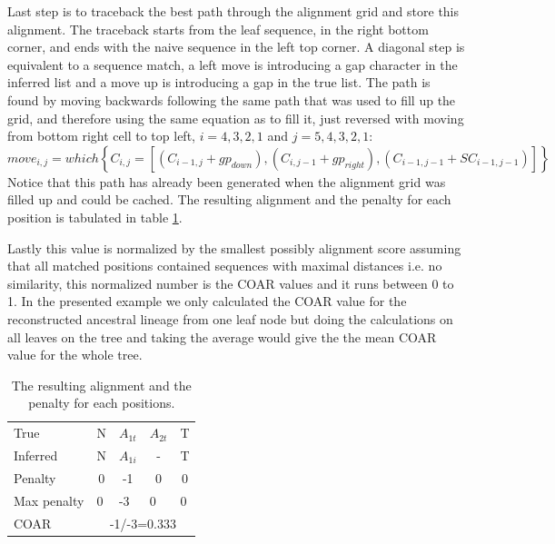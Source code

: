 Last step is to traceback the best path through the alignment grid and store this alignment.
The traceback starts from the leaf sequence, in the right bottom corner, and ends with the naive sequence in the left top corner.
A diagonal step is equivalent to a sequence match, a left move is introducing a gap character in the inferred list and a move up is introducing a gap in the true list.
The path is found by moving backwards following the same path that was used to fill up the grid, and therefore using the same equation as to fill it, just reversed with moving from bottom right cell to top left, $i=4,3,2,1$ and $j=5,4,3,2,1$:
$$
move_{i,j} = which\left\{ C_{i,j} = [(C_{i-1,j} + gp_{down}), (C_{i,j-1} + gp_{right}), (C_{i-1,j-1 } + SC_{i-1,j-1})] \right\}
$$
Notice that this path has already been generated when the alignment grid was filled up and could be cached. The resulting alignment and the penalty for each position is tabulated in table \ref{NW_final_alignment}.

Lastly this value is normalized by the smallest possibly alignment score assuming that all matched positions contained sequences with maximal distances i.e. no similarity, this normalized number is the COAR values and it runs between 0 to 1.
In the presented example we only calculated the COAR value for the reconstructed ancestral lineage from one leaf node but doing the calculations on all leaves on the tree and taking the average would give the the mean COAR value for the whole tree.
\begin{table}[ht!]
\centering
\begin{tabular}{|lcccc|}
\hline
\multicolumn{1}{|l|}{True}     & \multicolumn{1}{c|}{N} & \multicolumn{1}{c|}{$A_{1t}$} & \multicolumn{1}{c|}{$A_{2t}$} & T                      \\
\multicolumn{1}{|l|}{Inferred} & \multicolumn{1}{c|}{N} & \multicolumn{1}{c|}{$A_{1i}$} & \multicolumn{1}{c|}{-}        & T                      \\ \hline
Penalty                        & 0                      & -1                             & 0                           & 0                      \\ \hline
Max penalty                    & \multicolumn{1}{l}{0}  & \multicolumn{1}{l}{-3}        & \multicolumn{1}{l}{0}       & \multicolumn{1}{l|}{0} \\ \hline
COAR                           & \multicolumn{4}{c|}{-1/-3=0.333}                                                                                    \\ \hline
\end{tabular}
    \caption{
         \label{NW_final_alignment}
             The resulting alignment and the penalty for each positions.
             }
\end{table}





